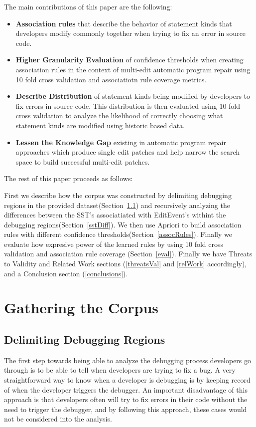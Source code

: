 \documentclass[sigconf]{acmart}
\begin{document}
The main contributions of this paper are the following:
\begin{itemize}
\item \textbf{Association rules} that describe the behavior
of statement kinds that developers modify commonly together when
trying to fix an error in source code.  

\item \textbf{Higher Granularity Evaluation} 
of confidence thresholds when creating
association rules in the context of multi-edit automatic
program repair using 10 fold cross validation and associatiotn
rule coverage metrics.

\item \textbf{Describe Distribution} of statement kinds being
modified by developers to fix errors in source code. This 
distribution is then evaluated using 10 fold cross validation
to analyze the likelihood of correctly choosing what statement
kinds are modified using historic based data. 

\item \textbf{Lessen the Knowledge Gap} existing in automatic
program repair approaches which produce single edit patches and
help narrow the search space to build successful multi-edit 
patches.


\end{itemize}

The rest of this paper proceeds as follows:

First we describe how the corpus was constructed by 
delimiting debugging regions in the provided dataset(Section~\ref{delimitDebugRegions}) and recursively analyzing the
differences between the SST's associatiated with EditEvent's
withint the debugging regions(Section~\ref{sstDiff}). 
We then use Apriori to build association rules with different
confidence thresholds(Section~\ref{assocRules}). Finally
we evaluate how expresive power of the learned rules by
using 10 fold cross validation and association rule coverage
(Section~\ref{eval}). Finally we have Threats to Validity and 
Related Work sections (\ref{threatsVal} and \ref{relWork} 
accordingly), and a Conclusion section (\ref{conclusions}).

\section{Gathering the Corpus}
\subsection{Delimiting Debugging Regions}
\label{delimitDebugRegions}
The first step towards being able to analyze the debugging
process developers go through is to be able to tell when
developers are trying to fix a bug. A very straightforward 
way to know when a developer is debugging is by keeping
record of when the developer triggers the debugger. An important
disadvantage of this approach is that 
developers often will try to fix errors in their code without the
need to trigger the debugger, and by following this approach,
these cases would not
be considered into the analysis.
\end{document}
